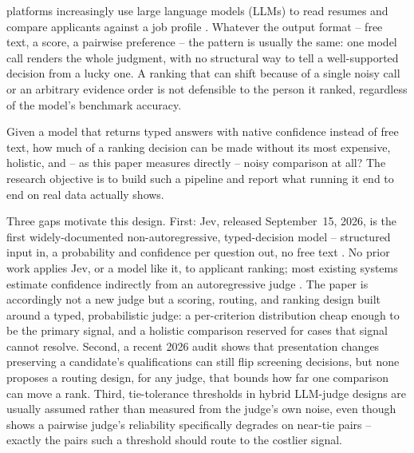 \documentclass[journal]{IEEEtran}
\begin{document}
 platforms increasingly use large language models (LLMs) to read resumes and compare applicants against a job profile \cite{ref1,ref2,ref3}. Whatever the output format -- free text, a score, a pairwise preference -- the pattern is usually the same: one model call renders the whole judgment, with no structural way to tell a well-supported decision from a lucky one. A ranking that can shift because of a single noisy call or an arbitrary evidence order is not defensible to the person it ranked, regardless of the model's benchmark accuracy.

Given a model that returns typed answers with native confidence instead of free text, how much of a ranking decision can be made without its most expensive, holistic, and -- as this paper measures directly -- noisy comparison at all? The research objective is to build such a pipeline and report what running it end to end on real data actually shows.

Three gaps motivate this design. First: Jev, released September~15, 2026, is the first widely-documented non-autoregressive, typed-decision model -- structured input in, a probability and confidence per question out, no free text \cite{ref4,ref5,ref6}. No prior work applies Jev, or a model like it, to applicant ranking; most existing systems estimate confidence indirectly from an autoregressive judge \cite{ref1,ref2,ref3,ref7}. The paper is accordingly not a new judge but a scoring, routing, and ranking design built around a typed, probabilistic judge: a per-criterion distribution cheap enough to be the primary signal, and a holistic comparison reserved for cases that signal cannot resolve. Second, a recent 2026 audit \cite{ref8} shows that presentation changes preserving a candidate's qualifications can still flip screening decisions, but none proposes a routing design, for any judge, that bounds how far one comparison can move a rank. Third, tie-tolerance thresholds in hybrid LLM-judge designs are usually assumed rather than measured from the judge's own noise, even though \cite{ref9} shows a pairwise judge's reliability specifically degrades on near-tie pairs -- exactly the pairs such a threshold should route to the costlier signal.
\end{document}
